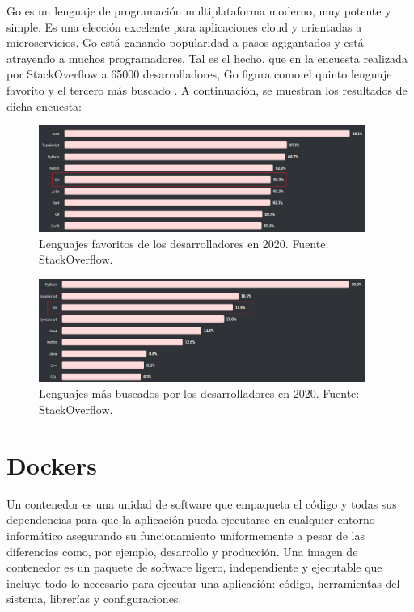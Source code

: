 Go es un lenguaje de programación multiplataforma moderno, muy potente y simple. Es una elección excelente para aplicaciones cloud y orientadas a microservicios. Go está ganando popularidad a pasos agigantados y está atrayendo a muchos programadores. Tal es el hecho, que en la encuesta realizada por StackOverflow a 65000 desarrolladores, Go figura como el quinto lenguaje favorito y el tercero más buscado . A continuación, se muestran los resultados de dicha encuesta: 

\begin{figure}[ht]
	\begin{center}
		\includegraphics[width = 0.95\textwidth]{Figuras/queridos.png}
	\end{center}
	\caption{\label{fig:Loved} Lenguajes favoritos de los desarrolladores en 2020. Fuente: StackOverflow.}
\end{figure}

\begin{figure}[ht]
	\begin{center}
		\includegraphics[width = 0.95\textwidth]{Figuras/buscados.png}
	\end{center}
	\caption{\label{fig:Wanted} Lenguajes más buscados por los desarrolladores en 2020. Fuente: StackOverflow.}
\end{figure}

\section{Dockers}

Un contenedor es una unidad de software que empaqueta el código y todas sus dependencias para que la aplicación pueda ejecutarse en cualquier entorno informático asegurando su funcionamiento uniformemente a pesar de las diferencias como, por ejemplo, desarrollo y producción. Una imagen de contenedor es un paquete de software ligero, independiente y ejecutable que incluye todo lo necesario para ejecutar una aplicación: código, herramientas del sistema, librerías y configuraciones.

